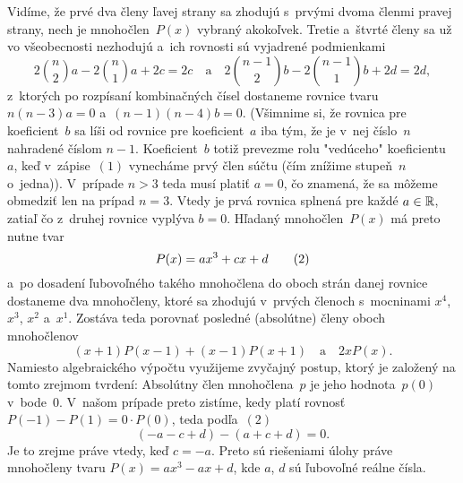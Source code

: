 {$$$$
Vidíme, že prvé dva členy ľavej strany sa zhodujú
s~prvými dvoma členmi pravej strany, nech je mnohočlen~$P(x)$
vybraný akokoľvek. Tretie a~štvrté členy sa už vo všeobecnosti nezhodujú
a~ich rovnosti sú vyjadrené podmienkami
$$
2\binom{n}{2}a-2\binom{n}{1}a+2c=2c\quad\text{a}\quad
2\binom{n-1}{2}b-2\binom{n-1}{1}b+2d=2d,
$$
z~ktorých po rozpísaní kombinačných čísel dostaneme rovnice
tvaru $n(n-3)a=0$ a~$(n-1)(n-4)b=0$. (Všimnime si, že
rovnica pre koeficient~$b$ sa líši od rovnice pre koeficient~$a$
iba tým, že je v~nej číslo~$n$ nahradené číslom $n-1$. Koeficient~$b$
totiž prevezme rolu "vedúceho" koeficientu~$a$, keď
v~zápise~$(1)$ vynecháme prvý člen súčtu (čím znížime stupeň~$n$
o~jedna)). V~prípade $n>3$ teda musí platiť $a=0$, čo
znamená, že sa môžeme obmedziť len na prípad $n=3$. Vtedy je
prvá rovnica splnená pre každé $a\in\Bbb R$, zatiaľ čo z~druhej
rovnice vyplýva $b=0$. Hľadaný mnohočlen~$P(x)$ má preto nutne
tvar
$$
P(x)=ax^3+cx+d
\tag2
$$
a~po dosadení ľubovoľného takého mnohočlena do oboch strán
danej rovnice dostaneme dva mnohočleny, ktoré sa zhodujú v~prvých
členoch s~mocninami $x^{4}$, $x^{3}$, $x^{2}$
a~$x^{1}$. Zostáva teda porovnať posledné (absolútne) členy
oboch mnohočlenov
$$
(x+1)P(x-1)+(x-1)P(x+1)\quad\text{a}\quad 2xP(x).
$$
Namiesto algebraického výpočtu využijeme zvyčajný postup, ktorý je
založený na tomto zrejmom tvrdení: Absolútny člen
mnohočlena~$p$ je jeho hodnota~$p(0)$ v~bode~$0$. V~našom
prípade preto zistíme, kedy platí rovnosť $P({-1})-P(1)=0\cdot
P(0)$, teda podľa~$(2)$
$$
(-a-c+d)-(a+c+d)=0.
$$
Je to zrejme práve vtedy, keď $c={-a}$. Preto sú riešeniami
úlohy práve mnohočleny tvaru $P(x)=ax^3-ax+d$, kde
$a$, $d$ sú ľubovoľné reálne čísla.

}
